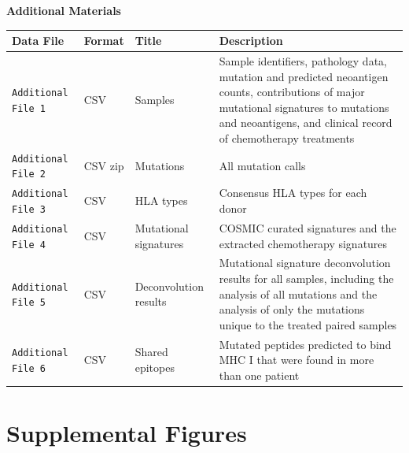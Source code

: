 
\pagebreak
\begin{center}
\textbf{\large Additional Materials}
\end{center}

\setcounter{equation}{0}
\setcounter{figure}{0}
\setcounter{table}{0}
\makeatletter
\renewcommand{\theequation}{S\arabic{equation}}
\renewcommand{\thefigure}{S\arabic{figure}}

\begin{center}
    \begin{tabular}{ | l | l | l | p{8cm} |}
    \hline
    Data File & Format & Title & Description \\ \hline
    \texttt{Additional File 1} & CSV & Samples & Sample identifiers, pathology data, mutation and predicted neoantigen counts, contributions of major mutational signatures to mutations and neoantigens, and clinical record of chemotherapy treatments \\ \hline

    \texttt{Additional File 2} & CSV zip & Mutations & All mutation calls \\ \hline
    
    \texttt{Additional File 3} & CSV & HLA types & Consensus HLA types for each donor \\ \hline
    
    \texttt{Additional File 4} & CSV & Mutational signatures & COSMIC curated signatures and the extracted chemotherapy signatures \\ \hline

    \texttt{Additional File 5} & CSV & Deconvolution results & Mutational signature deconvolution results for all samples, including the analysis of all mutations and the analysis of only the mutations unique to the treated paired samples  \\ \hline
    
    \texttt{Additional File 6} & CSV & Shared epitopes & Mutated peptides predicted to bind MHC I that were found in more than one patient  \\
    \hline


    \end{tabular}
\end{center}


\section*{Supplemental Figures}

